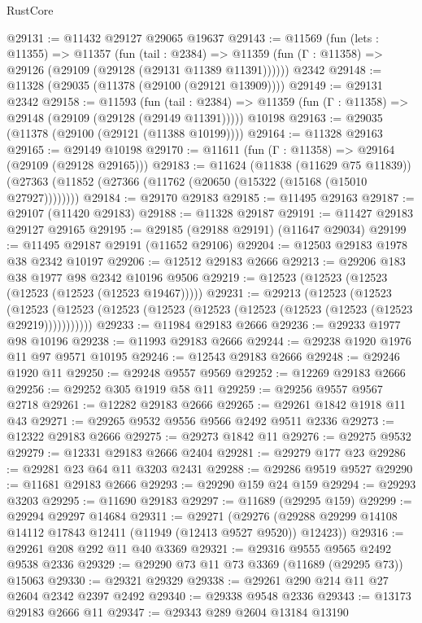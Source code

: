 \begin{lexlean}{RustCore}
\begin{coremodule}
@29131 := @11432 @29127 @29065 @19637
@29143 := @11569
    (fun (lets : @11355) =>
    @11357
      (fun (tail : @2384) =>
      @11359 (fun (Γ : @11358) => @29126 (@29109 (@29128 (@29131 @11389 @11391))))))
    @2342
@29148 := @11328 (@29035 (@11378 (@29100 (@29121 @13909))))
@29149 := @29131 @2342
@29158 := @11593
    (fun (tail : @2384) => @11359 (fun (Γ : @11358) => @29148 (@29109 (@29128 (@29149 @11391)))))
    @10198
@29163 := @29035 (@11378 (@29100 (@29121 (@11388 @10199))))
@29164 := @11328 @29163
@29165 := @29149 @10198
@29170 := @11611 (fun (Γ : @11358) => @29164 (@29109 (@29128 @29165)))
@29183 := @11624
    (@11838 (@11629 @75 @11839))
    (@27363 (@11852 (@27366 (@11762 (@20650 (@15322 (@15168 (@15010 @27927))))))))
@29184 := @29170 @29183
@29185 := @11495 @29163
@29187 := @29107 (@11420 @29183)
@29188 := @11328 @29187
@29191 := @11427 @29183 @29127 @29165
@29195 := @29185 (@29188 @29191) (@11647 @29034)
@29199 := @11495 @29187 @29191 (@11652 @29106)
@29204 := @12503 @29183 @1978 @38 @2342 @10197
@29206 := @12512 @29183 @2666
@29213 := @29206 @183 @38 @1977 @98 @2342 @10196 @9506
@29219 := @12523 (@12523 (@12523 (@12523 (@12523 (@12523 @19467)))))
@29231 := @29213
    (@12523
      (@12523
        (@12523 (@12523 (@12523 (@12523 (@12523 (@12523 (@12523 (@12523 (@12523 @29219)))))))))))
@29233 := @11984 @29183 @2666
@29236 := @29233 @1977 @98 @10196
@29238 := @11993 @29183 @2666
@29244 := @29238 @1920 @1976 @11 @97 @9571 @10195
@29246 := @12543 @29183 @2666
@29248 := @29246 @1920 @11
@29250 := @29248 @9557 @9569
@29252 := @12269 @29183 @2666
@29256 := @29252 @305 @1919 @58 @11
@29259 := @29256 @9557 @9567 @2718
@29261 := @12282 @29183 @2666
@29265 := @29261 @1842 @1918 @11 @43
@29271 := @29265 @9532 @9556 @9566 @2492 @9511 @2336
@29273 := @12322 @29183 @2666
@29275 := @29273 @1842 @11
@29276 := @29275 @9532
@29279 := @12331 @29183 @2666 @2404
@29281 := @29279 @177 @23
@29286 := @29281 @23 @64 @11 @3203 @2431
@29288 := @29286 @9519 @9527
@29290 := @11681 @29183 @2666
@29293 := @29290 @159 @24 @159
@29294 := @29293 @3203
@29295 := @11690 @29183
@29297 := @11689 (@29295 @159)
@29299 := @29294 @29297 @14684
@29311 := @29271
    (@29276 (@29288 @29299 @14108 @14112 @17843 @12411 (@11949 (@12413 @9527 @9520)) @12423))
@29316 := @29261 @208 @292 @11 @40 @3369
@29321 := @29316 @9555 @9565 @2492 @9538 @2336
@29329 := @29290 @73 @11 @73 @3369 (@11689 (@29295 @73)) @15063
@29330 := @29321 @29329
@29338 := @29261 @290 @214 @11 @27 @2604 @2342 @2397 @2492
@29340 := @29338 @9548 @2336
@29343 := @13173 @29183 @2666 @11
@29347 := @29343 @289 @2604 @13184 @13190

\end{coremodule}
\end{lexlean}
